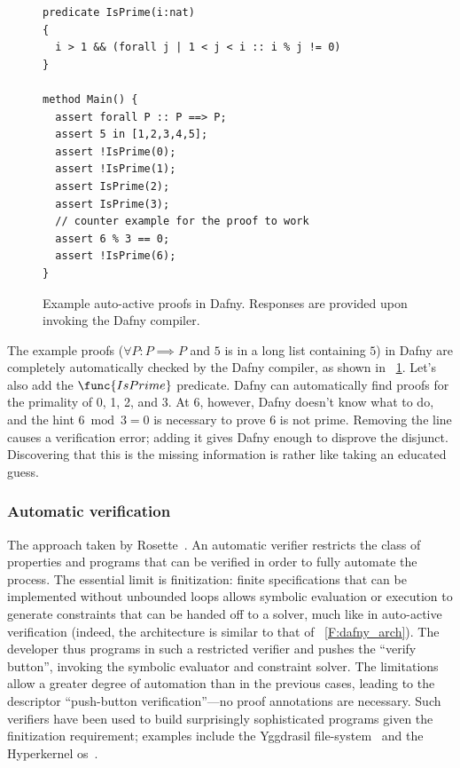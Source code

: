 \begin{figure}[ht]
\begin{verbatim}
predicate IsPrime(i:nat)
{
  i > 1 && (forall j | 1 < j < i :: i % j != 0)
}

method Main() {
  assert forall P :: P ==> P;
  assert 5 in [1,2,3,4,5];
  assert !IsPrime(0);
  assert !IsPrime(1);
  assert IsPrime(2);
  assert IsPrime(3);
  // counter example for the proof to work
  assert 6 % 3 == 0;
  assert !IsPrime(6);
}
\end{verbatim}
    \caption{Example auto-active proofs in Dafny. Responses are provided upon
    invoking the Dafny compiler.}\label{F:dafny_ex}
\end{figure}

The example proofs (\(\forall P: P \implies P\) and \(5\) is in a long list
containing \(5\)) in Dafny are completely automatically checked by the Dafny
compiler, as shown in \figurename~\ref{F:dafny_ex}. Let's also add the
\(\func{IsPrime}\) predicate. Dafny can automatically find proofs for the
primality of 0, 1, 2, and 3. At 6, however, Dafny doesn't know what to do, and
the hint \(6 \bmod 3 = 0\) is necessary to prove 6 is not prime. Removing the
line causes a verification error; adding it gives Dafny enough to disprove the
disjunct. Discovering that this is the missing information is rather like taking
an educated guess.

\subsubsection{Automatic verification}

The approach taken by Rosette~\cite{Torlak_2013}. An automatic verifier
restricts the class of properties and programs that can be verified in order to
fully automate the process. The essential limit is finitization: finite
specifications that can be implemented without unbounded loops allows symbolic
evaluation or execution to generate constraints that can be handed off to a
solver, much like in auto-active verification (indeed, the architecture is
similar to that of \figurename~\ref{F:dafny_arch}). The developer thus programs
in such a restricted verifier and pushes the ``verify button'', invoking the
symbolic evaluator and constraint solver. The limitations allow a greater degree
of automation than in the previous cases, leading to the descriptor
``push-button verification''---no proof annotations are necessary. Such
verifiers have been used to build surprisingly sophisticated programs given the
finitization requirement; examples include the Yggdrasil
file-system~\cite{Sigurbjarnarson_2016} and the Hyperkernel
\gls{os}~\cite{Nelson_2017}.


